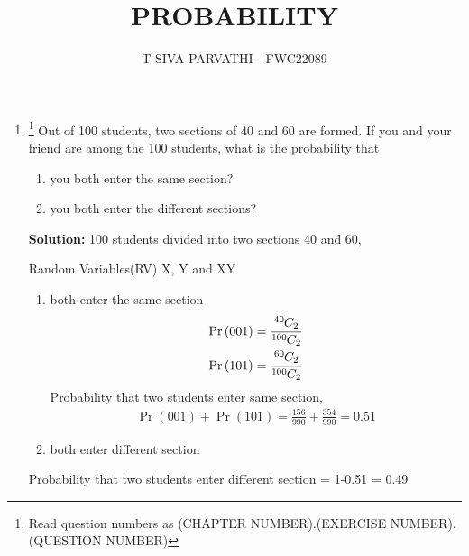 \documentclass{article}
\providecommand{\pr}[1]{\ensuremath{\Pr\left(#1\right)}}
\newcommand{\solution}{\noindent \textbf{Solution: }}
\newcommand*{\permcomb}[4][0mu]{{{}^{#3}\mkern#1#2_{#4}}}
\newcommand*{\comb}[1][-1mu]{\permcomb[#1]{C}}
\begin{document}
\title{PROBABILITY}
\author{\Large T SIVA PARVATHI - FWC22089}
\date{}

\maketitle
\begin{enumerate}[label=16.\arabic{enumi}.\arabic{enumii}]%
\setcounter{enumi}{3}
\setcounter{enumii}{5}

\item \footnote{Read question numbers as (CHAPTER NUMBER).(EXERCISE NUMBER).(QUESTION NUMBER)}
Out of 100 students, two sections of 40 and 60 are formed. If you and your friend are among the 100 students, what is the probability that
\begin{enumerate}
\item you both enter the same section?
\item you both enter the different sections?
\end{enumerate}

\solution
100 students divided into two sections 40 and 60,
\begin{table}[h]\centering
	
	 \caption{Random Variables(RV) X, Y and XY}\label{table:1}
\end{table}

\begin{enumerate}
\item both enter the same section
\begin{align}
\pr{001} = \frac{\comb{40}{2}} {\comb{100}{2}}\\
\pr{101} = \frac{\comb{60}{2}} {\comb{100}{2}}
\end{align}
Probability that two students enter same section,
\begin{align}
\pr{001}+\pr{101} = \frac{156}{990}+\frac{354}{990} = 0.51
\end{align}
\item both enter different section
\end{enumerate}
Probability that two students enter different section = 1-0.51 = 0.49

\end{enumerate}
\end{document}
